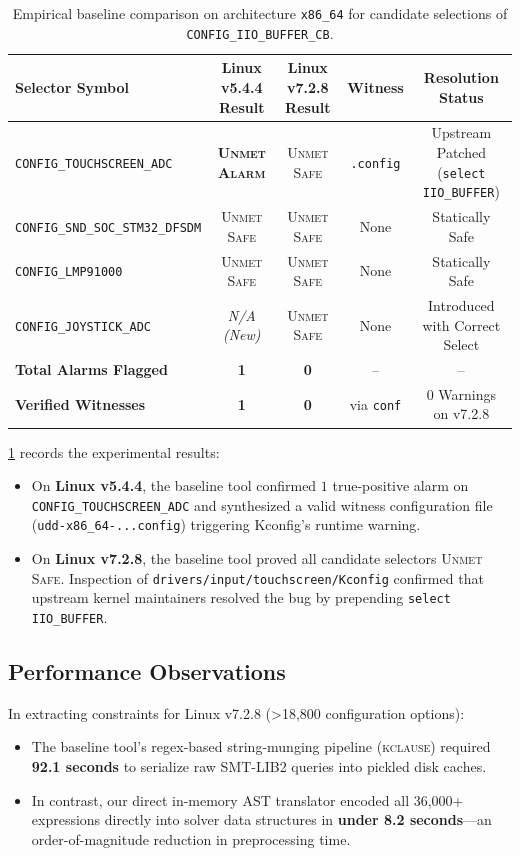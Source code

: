 \documentclass[acmsmall,screen,review,nonacm]{acmart}
\begin{document}
\begin{table}[ht]
\centering
\caption{Empirical baseline comparison on architecture \texttt{x86\_64} for candidate selections of \texttt{CONFIG\_IIO\_BUFFER\_CB}.}
\label{tab:baseline}
\footnotesize
\begin{tabular*}{\textwidth}{@{\extracolsep{\fill}}lcccc@{}}
\toprule
\textbf{Selector Symbol} & \textbf{Linux v5.4.4 Result} & \textbf{Linux v7.2.8 Result} & \textbf{Witness} & \textbf{Resolution Status} \\
\midrule
\texttt{CONFIG\_TOUCHSCREEN\_ADC} & \textbf{\textsc{Unmet Alarm}} & \textsc{Unmet Safe} & \texttt{.config} & Upstream Patched (\texttt{select IIO\_BUFFER}) \\
\texttt{CONFIG\_SND\_SOC\_STM32\_DFSDM} & \textsc{Unmet Safe} & \textsc{Unmet Safe} & None & Statically Safe \\
\texttt{CONFIG\_LMP91000} & \textsc{Unmet Safe} & \textsc{Unmet Safe} & None & Statically Safe \\
\texttt{CONFIG\_JOYSTICK\_ADC} & \emph{N/A (New)} & \textsc{Unmet Safe} & None & Introduced with Correct Select \\
\midrule
\textbf{Total Alarms Flagged} & \textbf{1} & \textbf{0} & -- & -- \\
\textbf{Verified Witnesses} & \textbf{1} & \textbf{0} & via \texttt{conf} & 0 Warnings on v7.2.8 \\
\bottomrule
\end{tabular*}
\end{table}

\cref{tab:baseline} records the experimental results:
\begin{itemize}
    \item On \textbf{Linux v5.4.4}, the baseline tool confirmed $1$ true-positive alarm on \texttt{CONFIG\_TOUCHSCREEN\_ADC} and synthesized a valid witness configuration file (\texttt{udd-x86\_64-...config}) triggering Kconfig's runtime warning.
    \item On \textbf{Linux v7.2.8}, the baseline tool proved all candidate selectors \textsc{Unmet Safe}. Inspection of \texttt{drivers/input/touchscreen/Kconfig} confirmed that upstream kernel maintainers resolved the bug by prepending \texttt{select IIO\_BUFFER}.
\end{itemize}

\subsection{Performance Observations}
In extracting constraints for Linux v7.2.8 (>18,800 configuration options):
\begin{itemize}
    \item The baseline tool's regex-based string-munging pipeline (\textsc{kclause}) required \textbf{92.1 seconds} to serialize raw SMT-LIB2 queries into pickled disk caches.
    \item In contrast, our direct in-memory AST translator encoded all 36,000+ expressions directly into solver data structures in \textbf{under 8.2 seconds}---an order-of-magnitude reduction in preprocessing time.
\end{itemize}
\end{document}
